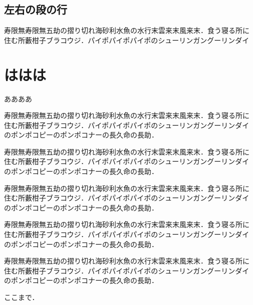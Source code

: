 \documentclass[a4j, 12Q, twocolumn, twoside]{jsarticle}
\begin{document}
\subsection{左右の段の行}


寿限無寿限無五劫の摺り切れ海砂利水魚の水行末雲来末風来末．食う寝る所に
住む所藪柑子ブラコウジ．パイポパイポパイポのシューリンガングーリンダイ


\section{ははは}
ああああ

寿限無寿限無五劫の摺り切れ海砂利水魚の水行末雲来末風来末．食う寝る所に
住む所藪柑子ブラコウジ．パイポパイポパイポのシューリンガングーリンダイ
のポンポコピーのポンポコナーの長久命の長助．

寿限無寿限無五劫の摺り切れ海砂利水魚の水行末雲来末風来末．食う寝る所に
住む所藪柑子ブラコウジ．パイポパイポパイポのシューリンガングーリンダイ
のポンポコピーのポンポコナーの長久命の長助．

寿限無寿限無五劫の摺り切れ海砂利水魚の水行末雲来末風来末．食う寝る所に
住む所藪柑子ブラコウジ．パイポパイポパイポのシューリンガングーリンダイ
のポンポコピーのポンポコナーの長久命の長助．

寿限無寿限無五劫の摺り切れ海砂利水魚の水行末雲来末風来末．食う寝る所に
住む所藪柑子ブラコウジ．パイポパイポパイポのシューリンガングーリンダイ
のポンポコピーのポンポコナーの長久命の長助．

寿限無寿限無五劫の摺り切れ海砂利水魚の水行末雲来末風来末．食う寝る所に
住む所藪柑子ブラコウジ．パイポパイポパイポのシューリンガングーリンダイ
のポンポコピーのポンポコナーの長久命の長助．

ここまで．
\end{document}
